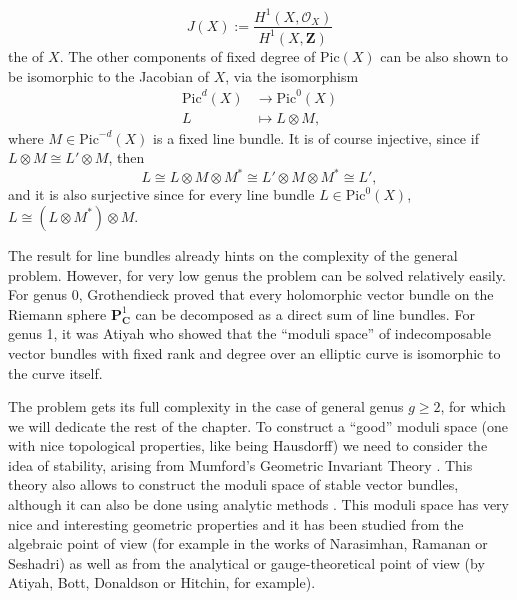 \documentclass[12pt,a4paper]{book}
\theoremstyle{definition} \newtheorem{defn}[thm]{Definition}
\theoremstyle{definition} \newtheorem{ejemplo}[thm]{Example}
\theoremstyle{remark} \newtheorem{rem}[thm]{Remark}
\def\OO{\mathscr{O}}
\def\CC{\mathbf{C}}
\def\ZZ{\mathbf{Z}}
\def\PP{\mathbf{P}}
\def\Pic{\mathrm{Pic}}
\let\emph\relax
\begin{document}
       \begin{equation*}
	 J(X):=	 \frac{H^1(X,\OO_X)}{H^1(X,\ZZ)}
       \end{equation*}
       the \emph{Jacobian} of $X$. The other components of fixed degree of $\Pic(X)$ can be also shown to be isomorphic to the Jacobian of $X$, via the isomorphism
       \begin{align*}
	  \Pic^d(X)&\longrightarrow \Pic^0(X)\\ 
	   L &\longmapsto L\otimes M, 
	 \end{align*}
	 where $M \in \Pic^{-d}(X)$ is a fixed line bundle. It is of course injective, since if $L\otimes M \cong L'\otimes M$, then 
	 \begin{equation*}
	   L\cong L\otimes M \otimes M^* \cong L' \otimes M \otimes M^* \cong L',
	 \end{equation*}
	 and it is also surjective since for every line bundle $L \in \Pic^0(X)$, $L\cong (L\otimes M^*) \otimes M$.
       
	 The result for line bundles already hints on the complexity of the general problem. However, for very low genus the problem can be solved relatively easily. For genus 0, Grothendieck \cite{grothendieck} proved that every holomorphic vector bundle on the Riemann sphere $\PP^1_\CC$ can be decomposed as a direct sum of line bundles. For genus 1, it was Atiyah \cite{atiyahelliptic} who showed that the ``moduli space'' of indecomposable vector bundles with fixed rank and degree over an elliptic curve is isomorphic to the curve itself. 

	 The problem gets its full complexity in the case of general genus $g\geq 2$, for which we will dedicate the rest of the chapter. To construct a ``good'' moduli space (one with nice topological properties, like being Hausdorff) we need to consider the idea of stability, arising from Mumford's Geometric Invariant Theory \cite{git}. This theory also allows to construct the moduli space of stable vector bundles, although it can also be done using analytic methods \cite{kobayashi}. This moduli space has very nice and interesting geometric properties and it has been studied from the algebraic point of view (for example in the works of Narasimhan, Ramanan or Seshadri) as well as from the analytical or gauge-theoretical point of view (by Atiyah, Bott, Donaldson or Hitchin, for example).
\end{document}
